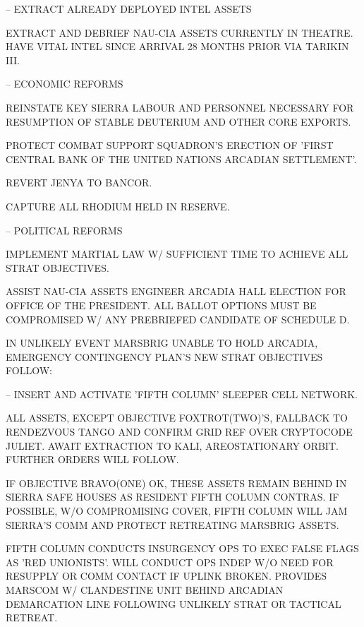 \item {} -- EXTRACT ALREADY DEPLOYED INTEL ASSETS
    \startitemize[n]
    \item EXTRACT AND DEBRIEF NAU-CIA ASSETS CURRENTLY IN THEATRE. HAVE VITAL INTEL SINCE ARRIVAL 28 MONTHS PRIOR VIA TARIKIN III.
    \stopitemize

\item {} -- ECONOMIC REFORMS
    \startitemize[n]
    \item REINSTATE KEY SIERRA LABOUR AND PERSONNEL NECESSARY FOR RESUMPTION OF STABLE DEUTERIUM AND OTHER CORE EXPORTS.
    \item PROTECT COMBAT SUPPORT SQUADRON'S ERECTION OF 'FIRST CENTRAL BANK OF THE UNITED NATIONS ARCADIAN SETTLEMENT'.
    \item REVERT JENYA TO BANCOR.
    \item CAPTURE ALL RHODIUM HELD IN RESERVE.
    \stopitemize

\item {} -- POLITICAL REFORMS
    \startitemize[n]
    \item IMPLEMENT MARTIAL LAW W/ SUFFICIENT TIME TO ACHIEVE ALL STRAT OBJECTIVES.
    \item ASSIST NAU-CIA ASSETS ENGINEER ARCADIA HALL ELECTION FOR OFFICE OF THE PRESIDENT. ALL BALLOT OPTIONS MUST BE COMPROMISED W/ ANY PREBRIEFED CANDIDATE OF SCHEDULE D.
    \stopitemize
\stopitemize

IN UNLIKELY EVENT MARSBRIG UNABLE TO HOLD ARCADIA, EMERGENCY CONTINGENCY PLAN'S NEW STRAT OBJECTIVES FOLLOW:
\startitemize[4]
\item {} -- INSERT AND ACTIVATE 'FIFTH COLUMN' SLEEPER CELL NETWORK.

    \startitemize[n]
    \item ALL ASSETS, EXCEPT OBJECTIVE FOXTROT(TWO)'S, FALLBACK TO RENDEZVOUS TANGO AND CONFIRM GRID REF OVER CRYPTOCODE JULIET. AWAIT EXTRACTION TO KALI, AREOSTATIONARY ORBIT. FURTHER ORDERS WILL FOLLOW.

    \item IF OBJECTIVE BRAVO(ONE) OK, THESE ASSETS REMAIN BEHIND IN SIERRA SAFE HOUSES AS RESIDENT FIFTH COLUMN CONTRAS. IF POSSIBLE, W/O COMPROMISING COVER, FIFTH COLUMN WILL JAM SIERRA'S COMM AND PROTECT RETREATING MARSBRIG ASSETS.

    \item FIFTH COLUMN CONDUCTS INSURGENCY OPS TO EXEC FALSE FLAGS AS 'RED UNIONISTS'. WILL CONDUCT OPS INDEP W/O NEED FOR RESUPPLY OR COMM CONTACT IF UPLINK BROKEN. PROVIDES MARSCOM W/ CLANDESTINE UNIT BEHIND ARCADIAN DEMARCATION LINE FOLLOWING UNLIKELY STRAT OR TACTICAL RETREAT.

